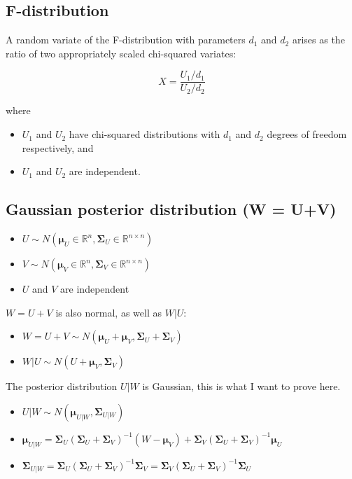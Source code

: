 \documentclass{article}
\begin{document}
\begin{appendices}
\subsection{F-distribution} \label{app:F_distribution}

A random variate of the F-distribution with parameters $d_1$ and $d_2$ arises as the ratio of two appropriately scaled chi-squared variates:

\begin{equation}
    X = \frac{U_1 / d_1}{U_2 / d_2}
\end{equation}

where

\begin{itemize}
    \item $U_{1}$ and $U_{2}$ have chi-squared distributions with $d_{1}$ and $d_{2}$ degrees of freedom respectively, and
    \item $U_{1}$ and $U_{2}$ are independent.
\end{itemize}

\subsection{Gaussian posterior distribution (W = U+V)} \label{app:Gaussian_posterior}

\begin{itemize}
    \item $U \sim N(\bm{\mu}_U \in \mathbb{R}^n, \bm{\Sigma}_U \in \mathbb{R}^{n\times n})$
    \item $V \sim N(\bm{\mu}_V \in \mathbb{R}^n, \bm{\Sigma}_V \in \mathbb{R}^{n\times n})$
    \item $U$ and $V$ are independent
\end{itemize}

$W = U + V$ is also normal, as well as $W|U$:

\begin{itemize}
    \item $W = U + V \sim N(\bm{\mu}_U + \bm{\mu}_V, \bm{\Sigma}_U + \bm{\Sigma}_V)$
    \item $W|U \sim N(U + \bm{\mu}_V, \bm{\Sigma}_V)$
\end{itemize}

The posterior distribution $U|W$ is Gaussian, this is what I want to prove here.

\begin{itemize}
    \item $U|W \sim N(\bm{\mu}_{U|W}, \bm{\Sigma}_{U|W})$
    \item $\bm{\mu}_{U|W} = \bm{\Sigma}_U (\bm{\Sigma}_U + \bm{\Sigma}_V)^{-1} (W - \bm{\mu}_V) + \bm{\Sigma}_V (\bm{\Sigma}_U + \bm{\Sigma}_V)^{-1}\bm{\mu}_U$
    \item $\bm{\Sigma}_{U|W} = \bm{\Sigma}_U (\bm{\Sigma}_U + \bm{\Sigma}_V)^{-1} \bm{\Sigma}_V = \bm{\Sigma}_V (\bm{\Sigma}_U + \bm{\Sigma}_V)^{-1} \bm{\Sigma}_U$
\end{itemize}


\end{appendices}
\end{document}
